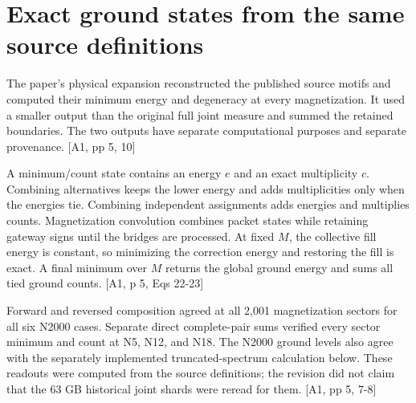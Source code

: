 \section{Exact ground states from the same source definitions}\label{exact-ground-states-from-the-same-source-definitions}

The paper's physical expansion reconstructed the published source motifs and computed their minimum energy and degeneracy at every magnetization. It used a smaller output than the original full joint measure and summed the retained boundaries. The two outputs have separate computational purposes and separate provenance. {[}A1, pp 5, 10{]}

A minimum/count state contains an energy \(e\) and an exact multiplicity \(c\). Combining alternatives keeps the lower energy and adds multiplicities only when the energies tie. Combining independent assignments adds energies and multiplies counts. Magnetization convolution combines packet states while retaining gateway signs until the bridges are processed. At fixed \(M\), the collective fill energy is constant, so minimizing the correction energy and restoring the fill is exact. A final minimum over \(M\) returns the global ground energy and sums all tied ground counts. {[}A1, p 5, Eqs 22-23{]}

Forward and reversed composition agreed at all 2,001 magnetization sectors for all six N2000 cases. Separate direct complete-pair sums verified every sector minimum and count at N5, N12, and N18. The N2000 ground levels also agree with the separately implemented truncated-spectrum calculation below. These readouts were computed from the source definitions; the revision did not claim that the 63 GB historical joint shards were reread for them. {[}A1, pp 5, 7-8{]}

